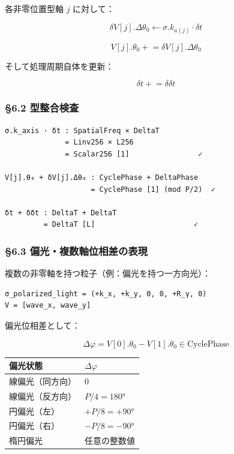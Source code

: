 \documentclass[a4paper,11pt]{ltjsarticle}
\newcounter{none}
\begin{document}
各非零位置型軸 \(j\) に対して：

\[\delta V[j].\Delta\theta_0 \leftarrow \sigma.k_{a(j)} \cdot \delta t\]

\[V[j].\theta_0 \mathrel{+}= \delta V[j].\Delta\theta_0\]

そして処理周期自体を更新：

\[\delta t \mathrel{+}= \delta\delta t\]

\subsubsection{§6.2 型整合検査}\label{ux578bux6574ux5408ux691cux67fb}

\begin{verbatim}
σ.k_axis · δt : SpatialFreq × DeltaT 
              = Linv256 × L256 
              = Scalar256 [1]                ✓

V[j].θ₀ + δV[j].Δθ₀ : CyclePhase + DeltaPhase 
                    = CyclePhase [1] (mod P/2)  ✓

δt + δδt : DeltaT + DeltaT 
         = DeltaT [L]                       ✓
\end{verbatim}

\subsubsection{§6.3
偏光・複数軸位相差の表現}\label{ux504fux5149ux8907ux6570ux8ef8ux4f4dux76f8ux5deeux306eux8868ux73fe}

複数の非零軸を持つ粒子（例：偏光を持つ一方向光）：

\begin{verbatim}
σ_polarized_light = (+k_x, +k_y, 0, 0, +R_γ, 0)
V = [wave_x, wave_y]
\end{verbatim}

偏光位相差として：

\[\Delta\varphi = V[0].\theta_0 - V[1].\theta_0 \in \text{CyclePhase}\]

{\def\LTcaptype{none} %
\begin{longtable}[]{@{}ll@{}}
\toprule\noalign{}
偏光状態 & \(\Delta\varphi\) \\
\midrule\noalign{}
\endhead
\bottomrule\noalign{}
\endlastfoot
線偏光（同方向） & \(0\) \\
線偏光（反方向） & \(P/4 = 180°\) \\
円偏光（左） & \(+P/8 = +90°\) \\
円偏光（右） & \(-P/8 = -90°\) \\
楕円偏光 & 任意の整数値 \\
\end{longtable}
}
\end{document}
